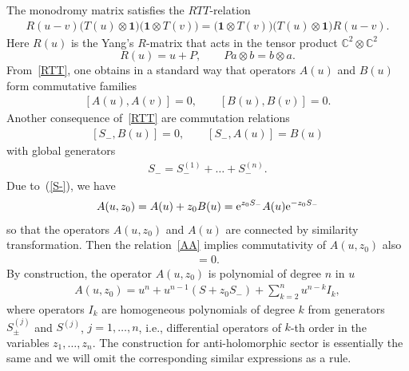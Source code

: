 \documentclass[pdftex]{sigma}
\numberwithin{equation}{section}
\begin{document}
The monodromy matrix satisfies the $RTT$-relation~\cite{F,KSk,Skl91}
\begin{align}\label{RTT}
R(u-v) \bigl(T(u)\otimes \bm{1}\bigr) \bigl(\bm{1} \otimes T(v)\bigr)
= \bigl(\bm{1} \otimes T(v)\bigr) \bigl(T(u)\otimes \bm{1}\bigr) R(u-v).
\end{align}
Here $R(u)$ is the Yang's $R$-matrix that acts in the tensor product $\mathbb{C}^2\otimes \mathbb{C}^2$
\begin{equation*}
	R(u) = u + P, \qquad P a \otimes b = b \otimes a.
\end{equation*}
From~\eqref{RTT}, one obtains in a standard way that operators $A(u)$ and $B(u)$
form commutative families
\begin{align}\label{AA}
[A(u), A(v)]=0, \qquad [B(u), B(v)]=0.
\end{align}
%
Another consequence of~\eqref{RTT} are commutation relations
\begin{align}\label{S-}
[S_- , B(u)] = 0 ,\qquad [S_- , A(u)] = B(u)
\end{align}
with global generators
\begin{align*}
S_- = S^{(1)}_-+\dots+S^{(n)}_-.
\end{align*}
Due to~(\ref{S-}), we have
\begin{align}\label{Az0B}
A(u,z_0) = A(u)+z_0 B(u) = {\rm e}^{z_0 S_{-}} A(u) {\rm e}^{-z_0 S_{-}}
\end{align}
so that the operators $A(u,z_0)$ and $A(u)$ are connected
by similarity transformation.
Then the relation~\eqref{AA} implies commutativity of
$A(u,z_0)$ also
\begin{align*}
[A(u,z_0) ,A(v,z_0)] = 0.
\end{align*}
By construction, the operator $A(u,z_0)$ is polynomial of degree $n$ in $u$
\begin{align}\label{ABCDexp}
A(u,z_0)=u^n+u^{n-1} \left(S+z_{0} S_{-}\right) +\sum_{k=2}^{n} u^{n-k} I_k ,
\end{align}
where operators $I_k$ are homogeneous polynomials of degree $k$
from generators $S^{(j)}_{\pm}$ and $S^{(j)}$, $j=1,\dots,n$, i.e., differential operators of $k$-th order in the variables $z_1,\dots,z_n$.
The construction for anti-holomorphic
sector is essentially the same and we will omit the corresponding similar expressions as a rule.
\end{document}
